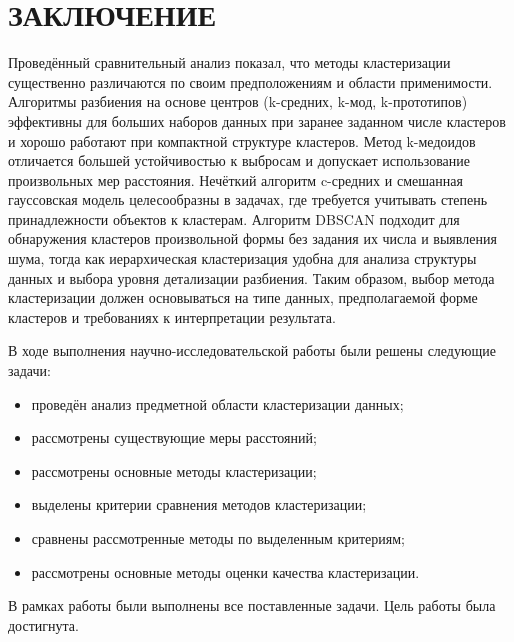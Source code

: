 \chapter*{ЗАКЛЮЧЕНИЕ}

Проведённый сравнительный анализ показал, что методы кластеризации существенно различаются по своим предположениям и области применимости. Алгоритмы разбиения на основе центров (k-средних, k-мод, k-прототипов) эффективны для больших наборов данных при заранее заданном числе кластеров и хорошо работают при компактной структуре кластеров. Метод k-медоидов отличается большей устойчивостью к выбросам и допускает использование произвольных мер расстояния. Нечёткий алгоритм c-средних и смешанная гауссовская модель целесообразны в задачах, где требуется учитывать степень принадлежности объектов к кластерам. Алгоритм DBSCAN подходит для обнаружения кластеров произвольной формы без задания их числа и выявления шума, тогда как иерархическая кластеризация удобна для анализа структуры данных и выбора уровня детализации разбиения. Таким образом, выбор метода кластеризации должен основываться на типе данных, предполагаемой форме кластеров и требованиях к интерпретации результата.

В ходе выполнения научно-исследовательской работы были решены следующие задачи:
\begin{itemize}
    \item[---] проведён анализ предметной области кластеризации данных;
    \item[---] рассмотрены существующие меры расстояний;
    \item[---] рассмотрены основные методы кластеризации;
    \item[---] выделены критерии сравнения методов кластеризации;
    \item[---] сравнены рассмотренные методы по выделенным критериям;
    \item[---] рассмотрены основные методы оценки качества кластеризации.
\end{itemize}

В рамках работы были выполнены все поставленные задачи. Цель работы была достигнута.